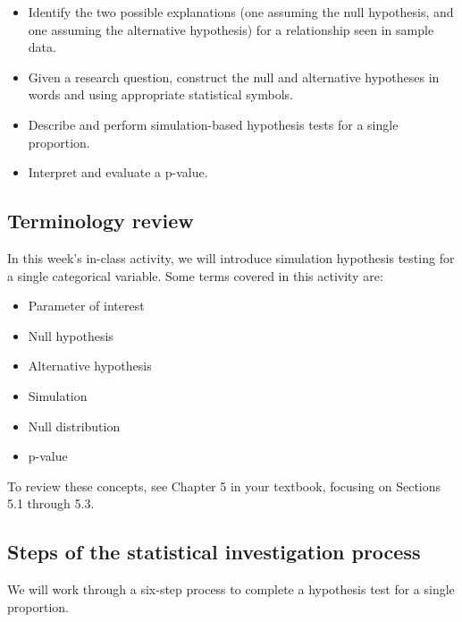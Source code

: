 \documentclass[
]{report}
\begin{document}
\begin{itemize}
\item
  Identify the two possible explanations (one assuming the null hypothesis, and one assuming the alternative hypothesis) for a relationship seen in sample data.
\item
  Given a research question, construct the null and alternative hypotheses
  in words and using appropriate statistical symbols.
\item
  Describe and perform simulation-based hypothesis tests for a single proportion.
\item
  Interpret and evaluate a p-value.
\end{itemize}

\hypertarget{terminology-review-5}{%
\subsection{Terminology review}\label{terminology-review-5}}

In this week's in-class activity, we will introduce simulation hypothesis testing for a single categorical variable. Some terms covered in this activity are:

\begin{itemize}
\item
  Parameter of interest
\item
  Null hypothesis
\item
  Alternative hypothesis
\item
  Simulation
\item
  Null distribution
\item
  p-value
\end{itemize}

To review these concepts, see Chapter 5 in your textbook, focusing on Sections 5.1 through 5.3.

\hypertarget{steps-of-the-statistical-investigation-process-1}{%
\subsection{Steps of the statistical investigation process}\label{steps-of-the-statistical-investigation-process-1}}

We will work through a six-step process to complete a hypothesis test for a single proportion.
\end{document}
